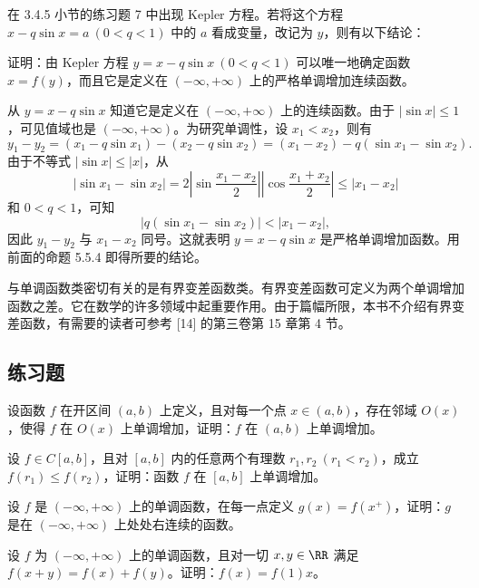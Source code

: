 在 3.4.5 小节的练习题 7 中出现 Kepler 方程。若将这个方程 $x-q\sin x=a\ (0<q<1)$ 中的 $a$ 看成变量，改记为 $y$，则有以下结论：

\begin{xexample}[5.5.2]
证明：由 Kepler 方程 $y=x-q\sin x\ (0<q<1)$ 可以唯一地确定函数 $x=f(y)$，而且它是定义在 $(-\infty,+\infty)$ 上的严格单调增加连续函数。
\end{xexample}
\begin{xproof}
从 $y=x-q\sin x$ 知道它是定义在 $(-\infty,+\infty)$ 上的连续函数。由于 $|\sin x|\le1$，可见值域也是 $(-\infty,+\infty)$。为研究单调性，设 $x_1<x_2$，则有
\[
  y_1-y_2=(x_1-q\sin x_1)-(x_2-q\sin x_2)=(x_1-x_2)-q(\sin x_1-\sin x_2).
\]
由于不等式 $|\sin x|\le|x|$，从
\[
  |\sin x_1-\sin x_2|=2\left|\sin\frac{x_1-x_2}{2}\right|\left|\cos\frac{x_1+x_2}{2}\right|\le|x_1-x_2|
\]
和 $0<q<1$，可知
\[
  |q(\sin x_1-\sin x_2)|<|x_1-x_2|,
\]
因此 $y_1-y_2$ 与 $x_1-x_2$ 同号。这就表明 $y=x-q\sin x$ 是严格单调增加函数。用前面的命题 5.5.4 即得所要的结论。
\end{xproof}

\begin{xremark}
与单调函数类密切有关的是有界变差函数类。有界变差函数可定义为两个单调增加函数之差。它在数学的许多领域中起重要作用。由于篇幅所限，本书不介绍有界变差函数，有需要的读者可参考 [14] 的第三卷第 15 章第 4 节。
\end{xremark}

\subsection{练习题}

\begin{xexercise}[1]
设函数 $f$ 在开区间 $(a,b)$ 上定义，且对每一个点 $x\in(a,b)$，存在邻域 $O(x)$，使得 $f$ 在 $O(x)$ 上单调增加，证明：$f$ 在 $(a,b)$ 上单调增加。
\end{xexercise}

\begin{xexercise}[2]
设 $f\in C[a,b]$，且对 $[a,b]$ 内的任意两个有理数 $r_1,r_2\ (r_1<r_2)$，成立 $f(r_1)\le f(r_2)$，证明：函数 $f$ 在 $[a,b]$ 上单调增加。
\end{xexercise}

\begin{xexercise}[3]
设 $f$ 是 $(-\infty,+\infty)$ 上的单调函数，在每一点定义 $g(x)=f(x^+)$，证明：$g$ 是在 $(-\infty,+\infty)$ 上处处右连续的函数。
\end{xexercise}

\begin{xexercise}[4]
设 $f$ 为 $(-\infty,+\infty)$ 上的单调函数，且对一切 $x,y\in\RR$ 满足 $f(x+y)=f(x)+f(y)$。证明：$f(x)=f(1)x$。
\end{xexercise}

